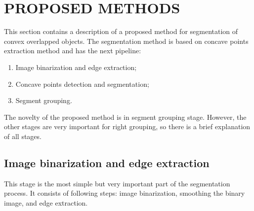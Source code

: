 \documentclass{lutmscthesis}[2010/09/22]
\begin{document}
\begin{figure}[htp]
\end{figure}


\section{PROPOSED METHODS}
\label{sec:proposed}

This section contains a description of a proposed method for segmentation of convex overlapped objects.
The segmentation method is based on concave points extraction method and has the next pipeline: 

\begin{enumerate}
    \item Image binarization and edge extraction;
    \item Concave points detection and segmentation;
    \item Segment grouping.
\end{enumerate}

The novelty of the proposed method is in segment grouping stage. However, the other stages are very important for right grouping, so there is a brief explanation of all stages.


\subsection{Image binarization and edge extraction}

This stage is the most simple but very important part of the segmentation process. It consists of following steps: image binarization, smoothing the binary image, and edge extraction.
\end{document}
